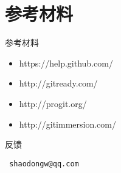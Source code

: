 \part{参考材料}

\begin{frame}[fragile]{参考材料}
    \begin{itemize}
        \item https://help.github.com/
        \item http://gitready.com/
        \item http://progit.org/
        \item http://gitimmersion.com/
    \end{itemize}
\end{frame}

% 

\begin{frame}[<+->][fragile]{反馈}

{\Large\tt
shaodongw@qq.com
}
\end{frame}

